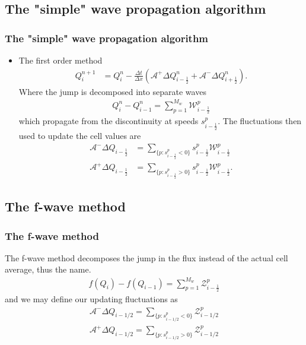 \documentclass{beamer}
\begin{document}
\subsection{The "simple" wave propagation algorithm}
\frame
{
  \frametitle{The "simple" wave propagation algorithm}
  \begin{itemize}
  \item<1-> The first order method
  \begin{align*}
Q_i^{n+1}&=Q_i^n-\frac{\Delta t}{\Delta x} (\mathcal{A}^+\Delta Q_{i-\frac{1}{2}}^n+\mathcal{A}^-\Delta Q_{i+\frac{1}{2}}^n).
\end{align*}
Where the jump is decomposed into separate waves
\begin{align*}
Q_i^n-Q_{i-1}^n=\sum_{p=1}^{M_w} \mathcal{W}_{i-\frac{1}{2}}^p
\end{align*}
which propagate from the discontinuity at speeds $s_{i-\frac{1}{2}}^p$.  The fluctuations then used to update the cell values are
\begin{align*}
\mathcal{A}^- \Delta Q_{i-\frac{1}{2}}&=\sum_{\lbrace p:s^p_{i-\frac{1}{2}}<0\rbrace} s_{i-\frac{1}{2}}^p \mathcal{W}_{i-\frac{1}{2}}^p\\
\mathcal{A}^+\Delta Q_{i-\frac{1}{2}}&=\sum_{\lbrace p: s_{i-\frac{1}{2}}^p>0\rbrace} s_{i-\frac{1}{2}}^p \mathcal{W}_{i-\frac{1}{2}}^p.
\end{align*}
  \end{itemize}
}

\subsection{The f-wave method}
\frame
{
\frametitle{The f-wave method}
The f-wave method decomposes the jump in the flux instead of the actual cell average, thus the name.
\begin{align*}
f(Q_i)-f(Q_{i-1})=\sum_{p=1}^{M_w} \mathcal{Z}_{i-\frac{1}{2}}^p
\end{align*}
and we may define our updating fluctuations as
\begin{align*}
\label{fwave fluc}
\mathcal{A}^- \Delta Q_{i-1/2}=\sum_{\{p:s_{i-1/2}^p <0\}} \mathcal{Z}_{i-1/2}^p\\
\mathcal{A}^+ \Delta Q_{i-1/2}=\sum_{\{p:s_{i-1/2}^p >0\}} \mathcal{Z}_{i-1/2}^p
\end{align*}
}
\end{document}
